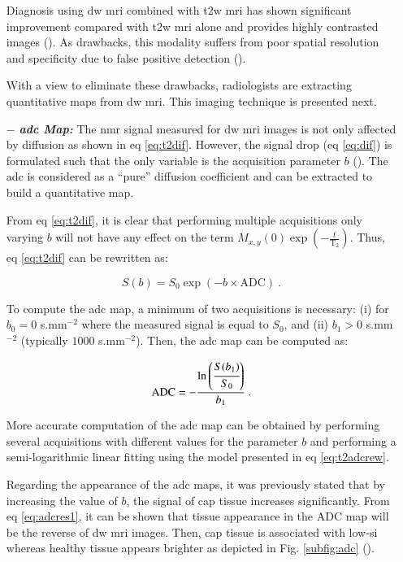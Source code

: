 \begin{enumerate}[leftmargin=*]
Diagnosis using \ac{dw} \ac{mri} combined with \ac{t2w} \ac{mri} has shown significant improvement compared with \ac{t2w} \ac{mri} alone and provides highly contrasted images (\cite{Shimofusa2005,Padhani2011,Choi2007}). As drawbacks, this modality suffers from poor spatial resolution and specificity due to false positive detection (\cite{Choi2007}).

With a view to eliminate these drawbacks, radiologists are extracting quantitative maps from \ac{dw} \ac{mri}. This imaging technique is presented next.

\item[$-$] \textbf{\textit{\ac{adc} Map:}} The \ac{nmr} signal measured for \ac{dw} \ac{mri} images is not only affected by diffusion as shown in \acs{eq} \ref{eq:t2dif}. However, the signal drop (\acs{eq} \ref{eq:dif}) is formulated such that the only variable is the acquisition parameter $b$ (\cite{LeBihan1986}). The \ac{adc} is considered as a ``pure'' diffusion coefficient and can be extracted to build a quantitative map.

From \acs{eq} \ref{eq:t2dif}, it is clear that performing multiple acquisitions only varying $b$ will not have any effect on the term  $M_{x,y}(0) \exp \left( - \frac{t}{\text{T}_2} \right)$. Thus, \acs{eq} \ref{eq:t2dif} can be rewritten as:

\begin{equation}
	S(b) = S_0 \exp \left( -b \times \text{ADC} \right) \ .
	\label{eq:t2adcrew}
\end{equation}

To compute the \ac{adc} map, a minimum of two acquisitions is necessary: (i) for $b_0=0$ s.mm$^{-2}$ where the measured signal is equal to $S_0$, and (ii) $b_1>0$ s.mm$^{-2}$ (typically $1000$ s.mm$^{-2}$). Then, the \ac{adc} map can be computed as:

\begin{equation}
	\text{ADC} = - \frac{\ln \left( \cfrac{S(b_1)}{S_0} \right) }{b_1} \ .
	\label{eq:adcres1}
\end{equation}

More accurate computation of the \ac{adc} map can be obtained by performing several acquisitions with different values for the parameter $b$ and performing a semi-logarithmic linear fitting using the model presented in \acs{eq} \ref{eq:t2adcrew}.

Regarding the appearance of the \ac{adc} maps, it was previously stated that by increasing the value of $b$, the signal of \ac{cap} tissue increases significantly. From \acs{eq} \ref{eq:adcres1}, it can be shown that tissue appearance in the ADC map will be the reverse of \ac{dw} \ac{mri} images. Then, \ac{cap} tissue is associated with low-\ac{si} whereas healthy tissue appears brighter as depicted in Fig. \ref{subfig:adc} (\cite{Barentsz2012}).


\end{enumerate}
